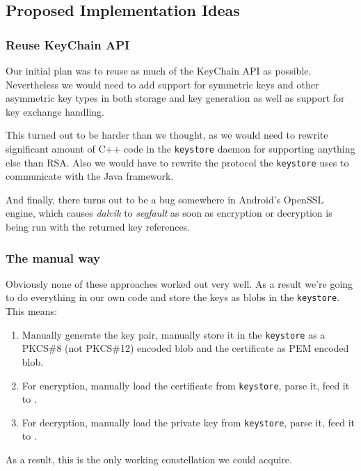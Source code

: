 \documentclass[a4paper,draft]{scrartcl}
\begin{document}
	\subsection{Proposed Implementation Ideas}
		\subsubsection{Reuse KeyChain API}
			Our initial plan was to reuse as much of the KeyChain API as possible. Nevertheless we would need to add support	for symmetric keys and other asymmetric key types in both storage and key generation as well as support for key	exchange handling.

			This turned out to be harder than we thought, as we would need to rewrite significant amount of C++ code in the	\texttt{keystore} daemon for supporting anything else than RSA. Also we would have to rewrite the protocol the \texttt{keystore} uses to communicate with the Java framework.
			
			And finally, there turns out to be a bug somewhere in Android's OpenSSL engine, which causes {\em dalvik} to	{\em segfault} as soon as encryption or decryption is being run with the returned key references.

		\subsubsection{The manual way}
			Obviously none of these approaches worked out very well. As a result we're going to do everything in our own code and store the keys as blobs in the \texttt{keystore}. This means:
			\begin{enumerate}
				\item Manually generate the key pair, manually store it in the \texttt{keystore} as a PKCS\#8 (not PKCS\#12) encoded blob and the certificate as PEM encoded blob.
				\item For encryption, manually load the certificate from \texttt{keystore}, parse it, feed it to .
				\item For decryption, manually load the private key from \texttt{keystore}, parse it, feed it to .
			\end{enumerate}
			As a result, this is the only working constellation we could acquire.
\end{document}
